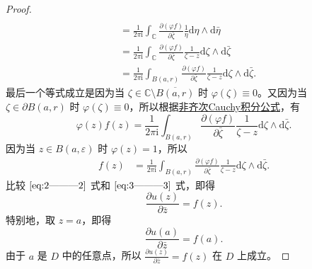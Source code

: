 \documentclass[../../main.tex]{subfiles}%
\begin{document}
\begin{proof}
\begin{align}
\\
&=\frac{1}{2\pi \mathrm{i}}\int_{\mathbb{C}}{\frac{\partial (\varphi f)}{\partial \bar{\zeta}}\frac{1}{\eta}\mathrm{d}\eta}\land \mathrm{d}\bar{\eta}
\nonumber 
\\
&=\frac{1}{2\pi \mathrm{i}}\int_{\mathbb{C}}{\frac{\partial (\varphi f)}{\partial \bar{\zeta}}\frac{1}{\zeta -z}\mathrm{d}\zeta}\land \mathrm{d}\bar{\zeta}
\nonumber 
\\
&=\frac{1}{2\pi \mathrm{i}}\int_{B(a,r)}{\frac{\partial (\varphi f)}{\partial \bar{\zeta}}\frac{1}{\zeta -z}\mathrm{d}\zeta}\land \mathrm{d}\bar{\zeta}.\label{eq:2---------2}
\end{align}
最后一个等式成立是因为当 \( \zeta \in \mathbb{C} \setminus \overline{B(a,r)} \) 时 \( \varphi(\zeta) \equiv 0 \)。又因为当 \( \zeta \in \partial B(a,r) \) 时 \( \varphi(\zeta) \equiv 0 \)，所以根据\hyperref[theorem:非齐次Cauchy积分公式(Pompeiu公式)]{非齐次Cauchy积分公式}，有
\[
\varphi(z)f(z) = \frac{1}{2\pi \mathrm{i}} \int_{B(a,r)} \frac{\partial(\varphi f)}{\partial \bar{\zeta}} \frac{1}{\zeta - z} \mathrm{d}\zeta \wedge \mathrm{d}\bar{\zeta}.
\]
因为当 \( z \in B(a,\varepsilon) \) 时 \( \varphi(z) = 1 \)，所以
\begin{align}
f(z) &= \frac{1}{2\pi \mathrm{i}} \int_{B(a,r)} \frac{\partial(\varphi f)}{\partial \bar{\zeta}} \frac{1}{\zeta - z} \mathrm{d}\zeta \wedge \mathrm{d}\bar{\zeta}. \label{eq:3---------3}
\end{align}
比较 \(\eqref{eq:2---------2}\) 式和 \(\eqref{eq:3---------3}\) 式，即得
\[
\frac{\partial u(z)}{\partial \bar{z}} = f(z).
\]
特别地，取 \( z = a \)，即得
\[
\frac{\partial u(a)}{\partial \bar{z}} = f(a).
\]
由于 \( a \) 是 \( D \) 中的任意点，所以 \( \frac{\partial u(z)}{\partial \bar{z}} = f(z) \) 在 \( D \) 上成立。
\end{proof}
\end{document}
